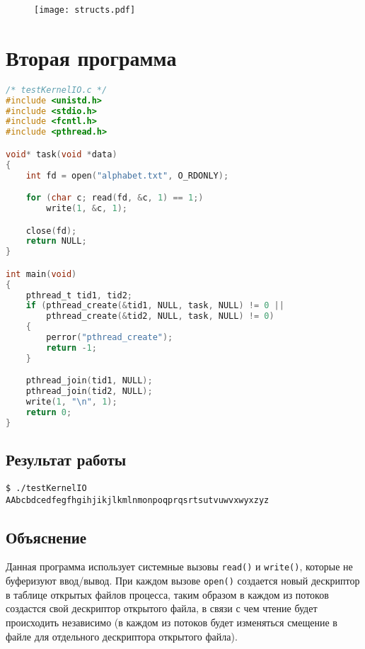 \begin{figure}[ht]
    \centering
    \texttt{[image: structs.pdf]}
\end{figure}

\chapter{Вторая программа}

\begin{lstlisting}[language=C]
/* testKernelIO.c */
#include <unistd.h>
#include <stdio.h>
#include <fcntl.h>
#include <pthread.h>

void* task(void *data)
{
    int fd = open("alphabet.txt", O_RDONLY);

    for (char c; read(fd, &c, 1) == 1;)
        write(1, &c, 1);

    close(fd);
    return NULL;
}

int main(void)
{
    pthread_t tid1, tid2;
    if (pthread_create(&tid1, NULL, task, NULL) != 0 ||
        pthread_create(&tid2, NULL, task, NULL) != 0)
    {
        perror("pthread_create");
        return -1;
    }

    pthread_join(tid1, NULL);
    pthread_join(tid2, NULL);
    write(1, "\n", 1);
    return 0;
}
\end{lstlisting}

\clearpage

\section{Результат работы}

\begin{lstlisting}
$ ./testKernelIO
AAbcbdcedfegfhgihjikjlkmlnmonpoqprqsrtsutvuwvxwyxzyz
\end{lstlisting}

\section{Объяснение}

Данная программа использует системные вызовы \texttt{read()} и \texttt{write()}, которые не буферизуют ввод/вывод. При каждом вызове \texttt{open()} создается новый дескриптор в таблице открытых файлов процесса, таким образом в каждом из потоков создастся свой дескриптор открытого файла, в связи с чем чтение будет происходить независимо (в каждом из потоков будет изменяться смещение в файле для отдельного дескриптора открытого файла). 


